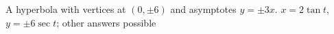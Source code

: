 {A hyperbola with vertices at $(0,\pm 6)$ and asymptotes $y=\pm 3x$.
}
{$x=2\tan t$, $y=\pm 6\sec t$; other answers possible
}